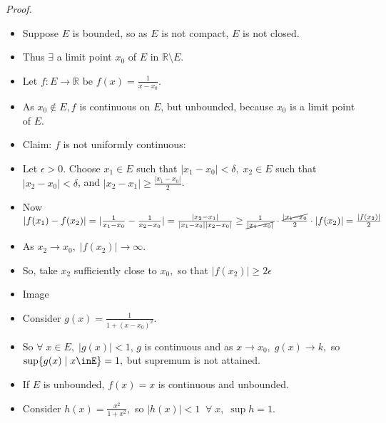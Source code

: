 \documentclass[12pt]{article}
\begin{document}
\vspace{1.5\baselineskip}
{\sl Proof.}
\begin{itemize}
    \item Suppose $E$ is bounded, so as $E$ is not compact, $E$ is not closed.
    \item Thus $\exists$ a limit point $x_0$ of $E$ in $\mathbb{R}\setminus E$.
    \item Let $f: E\rightarrow \mathbb{R}$ be $f(x)=\frac{1}{x-x_0}$.
    \item As $x_0 \notin E, f$ is continuous on $E$, but unbounded, because $x_0$ is a limit point of $E$.\\
    
    \item Claim: $f$ is not uniformly continuous:
    \item Let $\epsilon>0.$ Choose $x_1 \in E$ such that $|x_1-x_0|<\delta,\; x_2 \in E$ such that $|x_2-x_0|<\delta$, and $|x_2-x_1|\ge\frac{|x_1-x_0|}{2}$.
    \item Now $|f(x_1)-f(x_2)|=|\frac{1}{x_1-x_0}-\frac{1}{x_2-x_0}|=\frac{|x_2-x_1|}{|x_1-x_0||x_2-x_0|}\ge\frac{1}{\cancel{|x_1-x_0|}}\cdot \frac{\cancel{|x_1-x_0}}{2}\cdot|f(x_2)| = \frac{|f(x_2)|}{2}$
    \item As $x_2\to x_0,\; |f(x_2)|\to \infty$.
    \item So, take $x_2$ sufficiently close to $x_0,$ so that $|f(x_2)|\ge 2\epsilon$
    \item Image\\
    
    \item Consider $g(x)=\frac{1}{1+(x-x_0)^2}$.
    \item So $\forall\;x\in E,\; |g(x)|<1$, $g$ is continuous and as $x\to x_0,\; g(x)\to k,$ so $\sup\{g(x)\;|\;x\inE\}=1,$ but supremum is not attained.
    \item If $E$ is unbounded, $f(x)=x$ is continuous and unbounded.
    \item Consider $h(x)=\frac{x^2}{1+x^2},$ so $|h(x)|<1\;\;\forall\;x,\; \sup h=1$.
\end{itemize}
\end{document}
